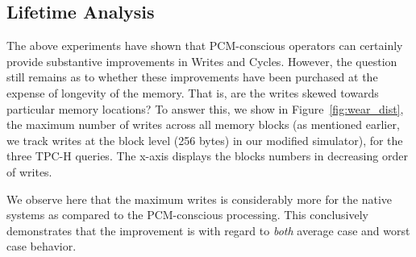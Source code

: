 \begin{figure*}[htbp]
\centering

\caption{Queries wear distribution }
\label{fig:wear_dist}
\end{figure*}



\subsection{Lifetime Analysis}
\begin{comment}
In \cite{qureshi}, the ideal lifetime $Y$ of a PCM device with size $S$
GB, $B$ write traffic, and cell endurance $W_{max}$, is given by:

$Y(years) = \frac{W_{max} \times S}{B} \times 2^{-25}$\\
\end{comment}

The above experiments have shown that PCM-conscious operators can
certainly provide substantive improvements in Writes and Cycles. However,
the question still remains as to whether these improvements have been
purchased at the expense of longevity of the memory. That is, are the
writes skewed towards particular memory locations?  To answer this, we
show in Figure~\ref{fig:wear_dist}, the maximum number of writes  across
all memory blocks (as mentioned earlier, we track writes at the block
level (256 bytes) in our modified simulator), for the three TPC-H queries. The x-axis displays the blocks numbers in decreasing order of writes.

We observe here that the maximum writes is considerably more for the
native systems as compared to the PCM-conscious processing. This
conclusively demonstrates that the improvement is with regard to
\emph{both} average case and worst case behavior.


